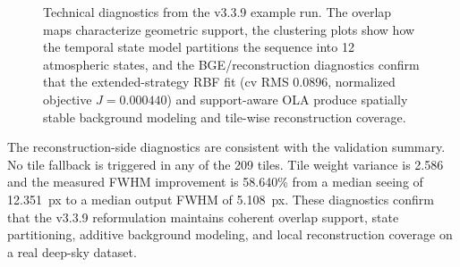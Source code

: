 \documentclass[10pt,twocolumn]{article}
\begin{document}
\begin{figure}[!t]
  \caption{Technical diagnostics from the v3.3.9 example run. The overlap maps characterize
           geometric support, the clustering plots show how the temporal state model partitions
           the sequence into 12 atmospheric states, and the BGE/reconstruction diagnostics
           confirm that the extended-strategy RBF fit (cv RMS \num{0.0896}, normalized
           objective $J=\num{0.000440}$) and support-aware OLA produce spatially stable
           background modeling and tile-wise reconstruction coverage.}
  \label{fig:art_generated_diagnostics}
\end{figure}

\noindent
The reconstruction-side diagnostics are consistent with the validation summary.
No tile fallback is triggered in any of the 209 tiles. Tile weight variance is \num{2.586}
and the measured FWHM improvement is \num{58.640}\% from a median seeing of \num{12.351}~px
to a median output FWHM of \num{5.108}~px. These diagnostics confirm that the v3.3.9
reformulation maintains coherent overlap support, state partitioning, additive background
modeling, and local reconstruction coverage on a real deep-sky dataset.
\end{document}
